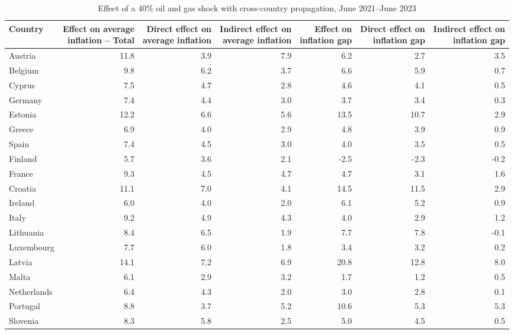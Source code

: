 \documentclass[11pt]{article}
\begin{document}
\setcounter{table}{2}
\begin{table}[H]
\centering
\caption{Effect of a 40\% oil and gas shock with cross-country propagation, June 2021--June 2023}
\label{tab:shock-oil-gas-chain-ea20}
\scriptsize
\setlength{\tabcolsep}{1.2pt}
\begin{tabular}{lrrrrrr}
\toprule
Country & \shortstack{Effect on average\\inflation -- Total} & \shortstack{Direct effect on\\average inflation} & \shortstack{Indirect effect on\\average inflation} & \shortstack{Effect on\\inflation gap} & \shortstack{Direct effect on\\inflation gap} & \shortstack{Indirect effect on\\inflation gap}
 \\
\midrule
Austria & 11.8 & 3.9 & 7.9 & 6.2 & 2.7 & 3.5
 \\
Belgium & 9.8 & 6.2 & 3.7 & 6.6 & 5.9 & 0.7
 \\
Cyprus & 7.5 & 4.7 & 2.8 & 4.6 & 4.1 & 0.5
 \\
Germany & 7.4 & 4.4 & 3.0 & 3.7 & 3.4 & 0.3
 \\
Estonia & 12.2 & 6.6 & 5.6 & 13.5 & 10.7 & 2.9
 \\
Greece & 6.9 & 4.0 & 2.9 & 4.8 & 3.9 & 0.9
 \\
Spain & 7.4 & 4.5 & 3.0 & 4.0 & 3.5 & 0.5
 \\
Finland & 5.7 & 3.6 & 2.1 & -2.5 & -2.3 & -0.2
 \\
France & 9.3 & 4.5 & 4.7 & 4.7 & 3.1 & 1.6
 \\
Croatia & 11.1 & 7.0 & 4.1 & 14.5 & 11.5 & 2.9
 \\
Ireland & 6.0 & 4.0 & 2.0 & 6.1 & 5.2 & 0.9
 \\
Italy & 9.2 & 4.9 & 4.3 & 4.0 & 2.9 & 1.2
 \\
Lithuania & 8.4 & 6.5 & 1.9 & 7.7 & 7.8 & -0.1
 \\
Luxembourg & 7.7 & 6.0 & 1.8 & 3.4 & 3.2 & 0.2
 \\
Latvia & 14.1 & 7.2 & 6.9 & 20.8 & 12.8 & 8.0
 \\
Malta & 6.1 & 2.9 & 3.2 & 1.7 & 1.2 & 0.5
 \\
Netherlands & 6.4 & 4.3 & 2.0 & 3.0 & 2.8 & 0.1
 \\
Portugal & 8.8 & 3.7 & 5.2 & 10.6 & 5.3 & 5.3
 \\
Slovenia & 8.3 & 5.8 & 2.5 & 5.0 & 4.5 & 0.5
 \\

\end{tabular}
\end{table}
\end{document}
